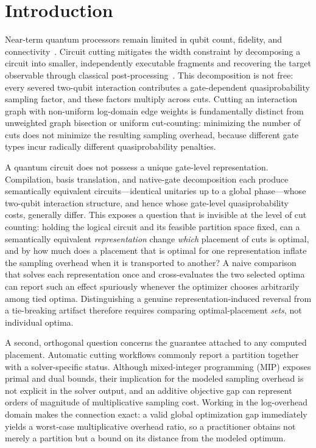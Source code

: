 \documentclass[
  aps,
  pra,
  reprint,
  amsmath,
  amssymb,
  longbibliography,
  nofootinbib,
  floatfix
]{revtex4-2}
\theoremstyle{plain}
\begin{document}
\maketitle

\section{Introduction}
\label{sec:intro}

Near-term quantum processors remain limited in qubit count, fidelity, and connectivity~\cite{preskill2018}. Circuit cutting mitigates the width constraint by decomposing a circuit into smaller, independently executable fragments and recovering the target observable through classical post-processing~\cite{peng2020,bravyi2016,tang2021}. This decomposition is not free: every severed two-qubit interaction contributes a gate-dependent quasiprobability sampling factor, and these factors multiply across cuts. Cutting an interaction graph with non-uniform log-domain edge weights is fundamentally distinct from unweighted graph bisection or uniform cut-counting: minimizing the number of cuts does not minimize the resulting sampling overhead, because different gate types incur radically different quasiprobability penalties.

A quantum circuit does not possess a unique gate-level representation. Compilation, basis translation, and native-gate decomposition each produce semantically equivalent circuits---identical unitaries up to a global phase---whose two-qubit interaction structure, and hence whose gate-level quasiprobability costs, generally differ. This exposes a question that is invisible at the level of cut counting: holding the logical circuit and its feasible partition space fixed, can a semantically equivalent \emph{representation} change \emph{which} placement of cuts is optimal, and by how much does a placement that is optimal for one representation inflate the sampling overhead when it is transported to another? A naive comparison that solves each representation once and cross-evaluates the two selected optima can report such an effect spuriously whenever the optimizer chooses arbitrarily among tied optima. Distinguishing a genuine representation-induced reversal from a tie-breaking artifact therefore requires comparing optimal-placement \emph{sets}, not individual optima.

A second, orthogonal question concerns the guarantee attached to any computed placement. Automatic cutting workflows commonly report a partition together with a solver-specific status. Although mixed-integer programming (MIP) exposes primal and dual bounds, their implication for the modeled sampling overhead is not explicit in the solver output, and an additive objective gap can represent orders of magnitude of multiplicative sampling cost. Working in the log-overhead domain makes the connection exact: a valid global optimization gap immediately yields a worst-case multiplicative overhead ratio, so a practitioner obtains not merely a partition but a bound on its distance from the modeled optimum.
\end{document}
